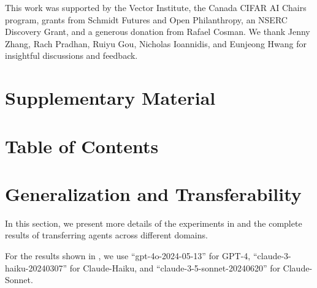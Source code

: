 \documentclass{article}
\begin{document}
This work was supported by the Vector Institute, the Canada CIFAR AI Chairs program, grants from Schmidt Futures and Open Philanthropy, an NSERC Discovery Grant, and a generous donation from Rafael Cosman. We thank Jenny Zhang, Rach Pradhan, Ruiyu Gou, Nicholas Ioannidis, and Eunjeong Hwang for insightful discussions and feedback.




\clearpage
\appendix




\section*{\LARGE Supplementary Material}

\vspace*{20pt}
\section*{Table of Contents}
\vspace*{-5pt}
\startcontents[sections]


\clearpage

\section{Generalization and Transferability}
\label{append_section:transfer}



In this section, we present more details of the experiments in  and the complete results of transferring agents across different domains.

For the results shown in , we use ``gpt-4o-2024-05-13'' for GPT-4, ``claude-3-haiku-20240307'' for Claude-Haiku, and ``claude-3-5-sonnet-20240620'' for Claude-Sonnet.
\end{document}
